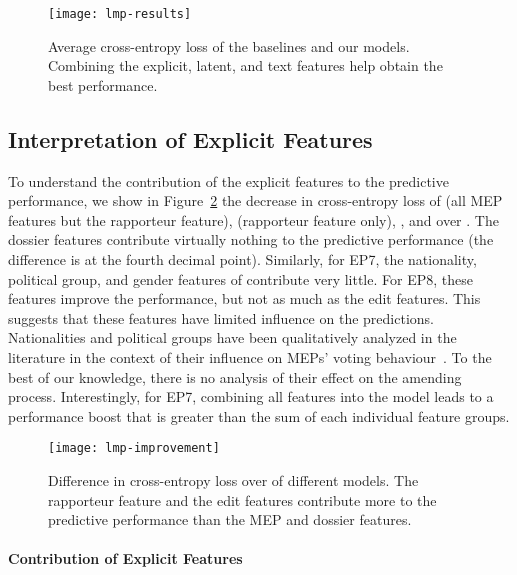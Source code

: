 \begin{figure}
  \centering
  \texttt{[image: lmp-results]}
	\caption{%
		Average cross-entropy loss of the baselines and our models.
		Combining the explicit, latent, and text features help obtain the best performance.
	}
	\label{lmp:fig:results}
\end{figure}

\subsection{Interpretation of Explicit Features}

To understand the contribution of the explicit features to the predictive performance, we show in Figure~\ref{lmp:fig:improvement} the decrease in cross-entropy loss of  (all MEP features but the rapporteur feature),  (rapporteur feature only), , and  over \wow.
The dossier features contribute virtually nothing to the predictive performance (the difference is at the fourth decimal point).
Similarly, for EP7, the nationality, political group, and gender features of  contribute very little.
For EP8, these features improve the performance, but not as much as the edit features.
This suggests that these features have limited influence on the predictions.
Nationalities and political groups have been qualitatively analyzed in the literature in the context of their influence on MEPs' voting behaviour~\cite{hix2002parliamentary,coman2009reassessing,muhlbock2012national,lefkofridi2014multilevel}.
To the best of our knowledge, there is no analysis of their effect on the amending process.
Interestingly, for EP7, combining all features into the  model leads to a performance boost that is greater than the sum of each individual feature groups.

\begin{figure}
  \centering
  \texttt{[image: lmp-improvement]}
	\caption{%
		Difference in cross-entropy loss over \wow{} of different models.
		The rapporteur feature and the edit features contribute more to the predictive performance than the MEP and dossier features.
	}
	\label{lmp:fig:improvement}
\end{figure}

\paragraph{Contribution of Explicit Features}

